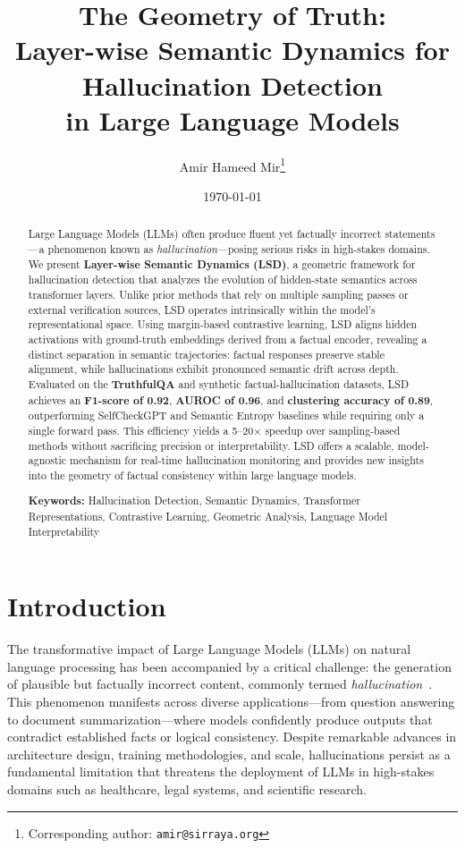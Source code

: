\documentclass[11pt]{article}
\title{\LARGE\textbf{The Geometry of Truth: \\[0.3em]
Layer-wise Semantic Dynamics for Hallucination Detection \\[0.2em]
in Large Language Models}}
\author[1]{Amir Hameed Mir\thanks{Corresponding author: \texttt{amir@sirraya.org}}}
\affil[1]{Sirraya Labs}
\date{\today}
\begin{document}
\maketitle

\begin{abstract}
\noindent
Large Language Models (LLMs) often produce fluent yet factually incorrect statements—a phenomenon known as \emph{hallucination}—posing serious risks in high-stakes domains. We present \textbf{Layer-wise Semantic Dynamics (LSD)}, a geometric framework for hallucination detection that analyzes the evolution of hidden-state semantics across transformer layers. Unlike prior methods that rely on multiple sampling passes or external verification sources, LSD operates intrinsically within the model’s representational space. Using margin-based contrastive learning, LSD aligns hidden activations with ground-truth embeddings derived from a factual encoder, revealing a distinct separation in semantic trajectories: factual responses preserve stable alignment, while hallucinations exhibit pronounced semantic drift across depth. Evaluated on the \textbf{TruthfulQA} and synthetic factual-hallucination datasets, LSD achieves an \textbf{F1-score of 0.92}, \textbf{AUROC of 0.96}, and \textbf{clustering accuracy of 0.89}, outperforming SelfCheckGPT and Semantic Entropy baselines while requiring only a single forward pass. This efficiency yields a 5–20× speedup over sampling-based methods without sacrificing precision or interpretability. LSD offers a scalable, model-agnostic mechanism for real-time hallucination monitoring and provides new insights into the geometry of factual consistency within large language models.


\vspace{0.5em}
\noindent\textbf{Keywords:} Hallucination Detection, Semantic Dynamics, Transformer Representations, Contrastive Learning, Geometric Analysis, Language Model Interpretability
\end{abstract}

\vspace{1em}

\tableofcontents

\section{Introduction}
\label{sec:intro}

The transformative impact of Large Language Models (LLMs) on natural language processing has been accompanied by a critical challenge: the generation of plausible but factually incorrect content, commonly termed \emph{hallucination}~\cite{ji2023survey}. This phenomenon manifests across diverse applications—from question answering to document summarization—where models confidently produce outputs that contradict established facts or logical consistency. Despite remarkable advances in architecture design, training methodologies, and scale, hallucinations persist as a fundamental limitation that threatens the deployment of LLMs in high-stakes domains such as healthcare, legal systems, and scientific research.
\end{document}
